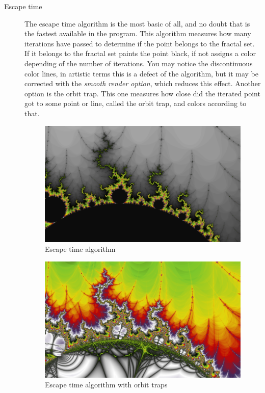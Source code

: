 \documentclass[oneside]{book}
\begin{document}
\begin{description}
\item[Escape time] The escape time algorithm is the most basic of all, and no doubt that is the fastest available in the program. This algorithm measures how many iterations have passed to determine if the point belongs to the fractal set. If it belongs to the fractal set paints the point black, if not assigns a color depending of the number of iterations. You may notice the discontinuous color lines, in artistic terms this is a defect of the algorithm, but it may be corrected with the \textit{smooth render option}, which reduces this effect. Another option is the orbit trap. This one measures how close did the iterated point got to some point or line, called the orbit trap, and colors according to that.

\begin{figure}[h!]
	\centering
	\includegraphics[scale=0.3]{img/fractal0.png}
	\caption{Escape time algorithm}
	\label{Escapetime}
\end{figure}

\begin{figure}[h!]
	\centering
	\includegraphics[scale=0.3]{img/fractal3.png}
	\caption{Escape time algorithm with orbit traps}
	\label{Orbit trap}
\end{figure}


\end{description}
\end{document}
